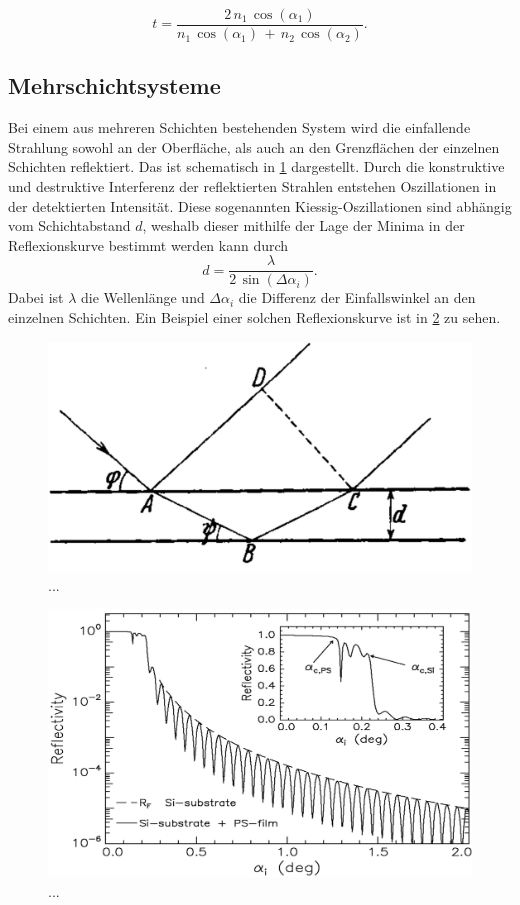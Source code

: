 \begin{equation*}
    t = \frac{2 \, n_1 \, \cos(\alpha_1)}{n_1 \, \cos(\alpha_1) \, + \, n_2 \, \cos(\alpha_2)}.
\end{equation*}


\subsection{Mehrschichtsysteme}
Bei einem aus mehreren Schichten bestehenden System wird die einfallende Strahlung sowohl an der Oberfläche, als auch an den Grenzflächen der einzelnen Schichten reflektiert. Das ist schematisch in \ref{fig:Kiessig} dargestellt.
Durch die konstruktive und destruktive Interferenz der reflektierten Strahlen entstehen Oszillationen in der detektierten Intensität. Diese sogenannten Kiessig-Oszillationen sind abhängig vom Schichtabstand $d$, weshalb dieser mithilfe der Lage der Minima in der Reflexionskurve bestimmt werden kann durch
\begin{equation}
    d = \frac{\lambda}{2 \, \sin(\Delta \alpha_i)}.
    \label{eq:Schichtdicke}
\end{equation}
Dabei ist $\lambda$ die Wellenlänge und $\Delta \alpha_i$ die Differenz der Einfallswinkel an den einzelnen Schichten.
Ein Beispiel einer solchen Reflexionskurve ist in \ref{fig:Kurve} zu sehen.

\begin{figure}
    \centering
    \includegraphics[width=0.5\linewidth]{./figures/Kiessig.png}
    \caption{...}
    \label{fig:Kiessig}
\end{figure}

\begin{figure}
    \centering
    \includegraphics[width=0.7\linewidth]{./figures/Kurve.png}
    \caption{...}
    \label{fig:Kurve}
\end{figure}

